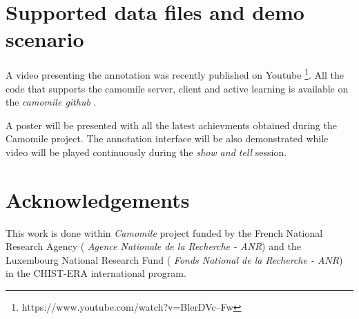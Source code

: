\documentclass[a4paper]{article}
\begin{document}






        \vspace{-0.3cm}
  \section{Supported data files and demo scenario}
          \vspace{-0.1cm}

A video presenting the annotation was recently published on Youtube \footnote{https://www.youtube.com/watch?v=BlerDVc--Fw}. All the code that supports the camomile server, client and active learning is available on the \textit{camomile github} \cite{urlgithub}.



A poster will be presented with all the latest achievments obtained during the Camomile project. The annotation interface will be also demonstrated while video will be played continuously during the \textit{show and tell} session. %

        \vspace{-0.3cm}
 \section{Acknowledgements}
  
    This work is done within \textit{Camomile} project funded by the French National Research Agency ( \textit{Agence Nationale de la Recherche - ANR}) and the Luxembourg National Research Fund ( \textit{Fonds National de la Recherche - ANR}) in the CHIST-ERA international program.

  
  \eightpt
  
  
  
\end{document}
